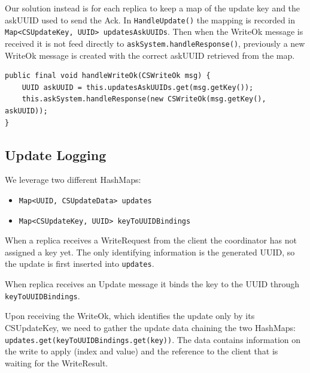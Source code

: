 \documentclass[a4paper]{article}
\begin{document}
            Our solution instead is for each replica to keep a map of the update key and the askUUID used to send the Ack.
            In \texttt{HandleUpdate()} the mapping is recorded in \texttt{Map<CSUpdateKey, UUID> updatesAskUUIDs}.
            Then when the WriteOk message is received it is not feed directly to \texttt{askSystem.handleResponse()}, previously a new WriteOk message is created with the correct askUUID retrieved from the map.

            \begin{verbatim}
public final void handleWriteOk(CSWriteOk msg) {
    UUID askUUID = this.updatesAskUUIDs.get(msg.getKey());
    this.askSystem.handleResponse(new CSWriteOk(msg.getKey(), askUUID));
}
            \end{verbatim}
            
        \subsection{Update Logging} \label{subsec:update_logging}
            We leverage two different HashMaps:
            \begin{itemize}
                \item \texttt{Map<UUID, CSUpdateData> updates}
                \item \texttt{Map<CSUpdateKey, UUID> keyToUUIDBindings}
            \end{itemize}

            When a replica receives a WriteRequest from the client the coordinator has not assigned a key yet. The only identifying information is the generated UUID, so the update is first inserted into \texttt{updates}.

            When replica receives an Update message it binds the key to the UUID through \texttt{keyToUUIDBindings}.

            Upon receiving the WriteOk, which identifies the update only by its CSUpdateKey, we need to gather the update data chaining the two HashMaps: \texttt{updates.get(keyToUUIDBindings.get(key))}. The data contains information on the write to apply (index and value) and the reference to the client that is waiting for the WriteResult.
    \newpage
\end{document}
